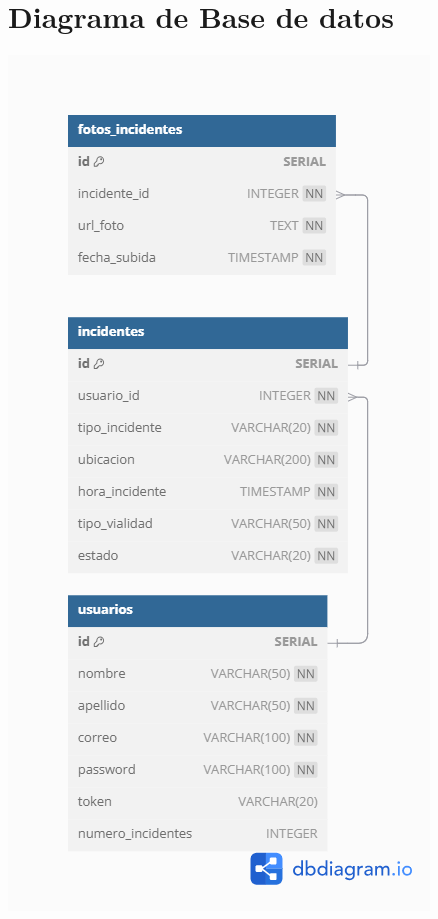 \section{Diagrama de Base de datos}

\begin{center}
    \includegraphics[scale = .7]{Ite02/SQL2.0.png}
\end{center}